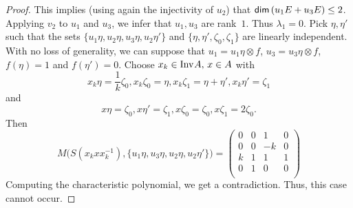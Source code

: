 \documentclass[a4paper,12pt,reqno]{amsart}
\numberwithin{equation}{section}
\theoremstyle{definition}
\begin{document}
\begin{proof}
This implies (using again the injectivity of $u_2$) that ${{\sf dim}\,} (u_1 E+u_3 E ) \leq 2$. Applying $v_2$ to $u_1$ and $u_3$,
we infer that $u_1, u_3$ are rank~$1$. Thus $\lambda_1=0$. Pick $\eta, \eta'$ such that the sets
$\{u_1 \eta, u_2 \eta, u_3 \eta, u_2 \eta'\}$ and $ \{\eta, \eta', \zeta_0, \zeta_1\}$ are linearly independent.
With no loss of generality, we can suppose that $u_1= u_1 \eta \otimes f$, $u_3= u_3 \eta \otimes f$, $f(\eta)=1$
and $f(\eta')=0$. Choose $x_k \in {{\textup{Inv}\kern.5pt A}},\, x \in A$ with
\begin{equation*}
x_k \eta= \frac{1}{k}\zeta_0, x_k \zeta_0= \eta, x_k \zeta_1=\eta+\eta', x_k \eta'= \zeta_1
\end{equation*}
and
\begin{equation*}
x \eta=\zeta_0, x \eta'= \zeta_1, x \zeta_0= \zeta_0, x \zeta_1= 2 \zeta_0.
\end{equation*}
Then
\begin{equation*}
M\bigl({S} (x_k x x_k^{-1}), \{u_1 \eta, u_3 \eta, u_2 \eta, u_2 \eta'\}\bigr)= \left(
                                                                      \begin{array}{cccc}
                                                                        0 & 0 & 1 & 0 \\
                                                                        0 & 0 & -k & 0 \\
                                                                        k & 1 & 1 & 1 \\
                                                                        0 & 1 & 0 & 0 \\
                                                                      \end{array}
                                                                    \right)
\end{equation*}
Computing the characteristic polynomial, we get a contradiction. Thus, this case cannot occur.


\end{proof}
\end{document}
